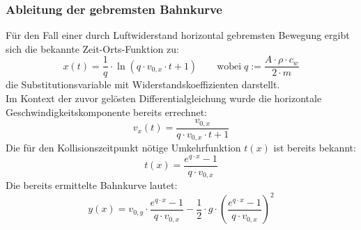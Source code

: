 \subsubsection{Ableitung der gebremsten Bahnkurve}

Für den Fall einer durch Luftwiderstand horizontal gebremsten Bewegung ergibt sich die bekannte Zeit-Orts-Funktion zu:
\[
x(t) = \frac{1}{q} \cdot \ln\!\left(q \cdot v_{0,x} \cdot t + 1 \right) \qquad \text{wobei} \; q := \frac{A \cdot \rho \cdot c_w}{2 \cdot m}
\]
die Substitutionsvariable mit Widerstandskoeffizienten darstellt.\\
Im Kontext der zuvor gelösten Differentialgleichung wurde die horizontale Geschwindigkeitskomponente bereits errechnet:
\[
v_x(t) = \frac{v_{0,x}}{q \cdot v_{0,x} \cdot t + 1}
\]
Die für den Kollisionszeitpunkt nötige Umkehrfunktion $t(x)$ ist bereits bekannt:
\[
t(x) = \frac{e^{q \cdot x} - 1}{q \cdot v_{0,x}}
\]
Die bereits ermittelte Bahnkurve lautet:
\[
y(x) = v_{0,y} \cdot \frac{e^{q \cdot x} - 1}{q \cdot v_{0,x}} 
- \frac{1}{2} \cdot g \cdot \left(\frac{e^{q \cdot x} - 1}{q \cdot v_{0,x}}\right)^2
\]

